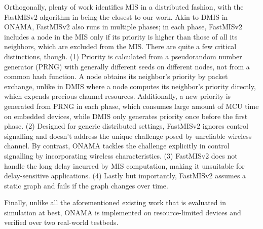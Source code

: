 \documentclass[conference]{IEEEtran}
\begin{document}
Orthogonally, plenty of work identifies MIS in a distributed fashion, with the FastMISv2 algorithm in \cite{fastmisv2} being the closest to our work. Akin to DMIS in ONAMA, FastMISv2 also runs in multiple phases; in each phase, FastMISv2 includes a node in the MIS only if its priority is higher than those of all its neighbors, which are excluded from the MIS. There are quite a few critical distinctions, though. (1) Priority is calculated from a pseudorandom number generator (PRNG) with generally different seeds on different nodes, not from a common hash function. A node obtains its neighbor's priority by packet exchange, unlike in DMIS where a node computes its neighbor's priority directly, which expends precious channel resources. Additionally, a new priority is generated from PRNG in each phase, which consumes large amount of MCU time on embedded devices, while DMIS only generates priority once before the first phase. (2) Designed for generic distributed settings, FastMISv2 ignores control signalling and doesn't address the unique challenge posed by unreliable wireless channel. By contrast, ONAMA tackles the challenge explicitly in control signalling by incorporating wireless characteristics. (3) FastMISv2 does not handle the long delay incurred by MIS computation, making it unsuitable for delay-sensitive applications. (4) Lastly but importantly, FastMISv2 assumes a static graph and fails if the graph changes over time.

Finally, unlike all the aforementioned existing work that is evaluated in simulation at best, ONAMA is implemented on resource-limited devices and verified over two real-world testbeds.
\end{document}
